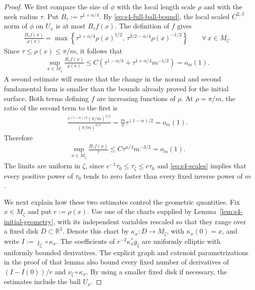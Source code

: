 \documentclass[a4paper,11pt,oneside,reqno]{amsart}
\numberwithin{equation}{section}
\theoremstyle{definition}
\begin{document}
\begin{proof}
    We first compare the size of $\phi$ with the local
    length scale $\rho$ and with the neck radius $\tau$.
    Put $B_\tau:=\tau^{1+\alpha/4}$. By
    \eqref{eq:s4-full-ball-bound}, the local scaled
    $C^{2,\beta}$ norm of $\phi$ on $U_x$ is at most
    $B_\tau f(x)$. The definition of $f$ gives
    \begin{align*}
        \frac{B_\tau f(x)}{\rho(x)}
        =\max\left\{
          \tau^{1+\alpha/4}\rho(x)^{1/2},\,
          \tau^{3/2-\alpha/4}\rho(x)^{-1/2}
        \right\}
        \qquad\forall\,x\in M_\zeta.
    \end{align*}
    Since $\tau\leq\rho(x)\leq\pi/m$, it follows that
    \begin{align}
        \label{eq:s4-dimensionless-phi}
        \sup_{x\in M_\zeta}\frac{B_\tau f(x)}{\rho(x)}
        \leq C\left(
            \tau^{1-\alpha/4}
            +\tau^{1+\alpha/4}m^{-1/2}\right)
        =o_m(1).
    \end{align}
    A second estimate will ensure that the change in the
    normal and second fundamental form is smaller than
    the bounds already proved for the initial surface.
    Both terms defining $f$ are increasing functions of
    $\rho$. At $\rho=\pi/m$, the ratio of the second
    term to the first is
    \begin{align*}
        \frac{\tau^{(1-\alpha)/2}(\pi/m)^{1/2}}
             {(\pi/m)^{3/2}}
        =\frac{m}{\pi}\tau^{(1-\alpha)/2}=o_m(1).
    \end{align*}
    Therefore
    \begin{align}
        \label{eq:s4-sharp-phi}
        \sup_{x\in M_\zeta}\frac{B_\tau f(x)}{\tau}
        \leq C\tau^{\alpha/4}m^{-3/2}=o_m(1).
    \end{align}
    The limits are uniform in $\zeta$, since
    $e^{-1}\tau_0\leq\tau_\zeta\leq e\tau_0$ and
    \eqref{eq:s4-scales} implies that every positive
    power of $\tau_0$ tends to zero faster than every
    fixed inverse power of $m$.

    We next explain how these two estimates control the
    geometric quantities. Fix $x\in M_\zeta$ and put
    $r:=\rho(x)$. Use one of the charts supplied by
    Lemma~\ref{lem:s4-initial-geometry}, with its
    independent variables rescaled so that they range
    over a fixed disk $D\subset\mathbb R^2$. Denote
    this chart by $\kappa_x:D\to M_\zeta$, with
    $\kappa_x(0)=x$, and write
    $I:=\jmath_\zeta\circ\kappa_x$. The coefficients of
    $r^{-2}\kappa_x^*g_\zeta$ are uniformly elliptic with
    uniformly bounded derivatives. The explicit graph
    and catenoid parametrizations in the proof of that
    lemma also bound every fixed number of derivatives
    of $(I-I(0))/r$ and $\nu_\zeta\circ\kappa_x$.
    By using a smaller fixed disk if necessary, the
    estimates include the ball $U_x$.


\end{proof}
\end{document}
